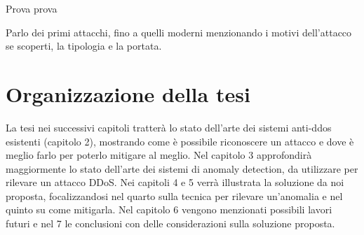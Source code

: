 
Prova prova

Parlo dei primi attacchi, fino a quelli moderni menzionando i motivi dell'attacco se scoperti, la tipologia e la portata.


\section{Organizzazione della tesi}

La tesi nei successivi capitoli tratterà lo stato dell'arte dei sistemi anti-ddos esistenti (capitolo 2), mostrando come è possibile riconoscere un attacco e dove è meglio farlo per poterlo mitigare al meglio. Nel capitolo 3 approfondirà maggiormente lo stato dell'arte dei sistemi di anomaly detection, da utilizzare per rilevare un attacco DDoS.
Nei capitoli 4 e 5 verrà illustrata la soluzione da noi proposta, focalizzandosi nel quarto sulla tecnica per rilevare un'anomalia e nel quinto su come mitigarla.
Nel capitolo 6 vengono menzionati possibili lavori futuri e nel 7 le conclusioni con delle considerazioni sulla soluzione proposta.